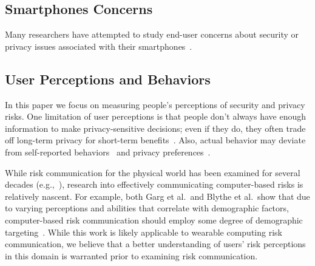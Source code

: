 \subsection{Smartphones Concerns}
Many researchers have attempted to study end-user concerns about security or privacy issues associated with their smartphones~\cite{chin2012measuring, palen2000going, felt2012android}.  

\subsection{User Perceptions and Behaviors}
In this paper we focus on measuring people's perceptions of security and privacy risks. One limitation of user perceptions is that people don't always have enough information to make privacy-sensitive decisions; even if they do, they often trade off long-term privacy for short-term benefits~\cite{acquisti2005privacy}. Also, actual behavior may deviate from self-reported behaviors~\cite{jensen2005privacy} and privacy preferences~\cite{spiekermann2001privacy}.

While risk communication for the physical world has been examined for several decades (e.g.,~\cite{Fischhoff,Morgan2001}), research into effectively communicating computer-based risks is relatively nascent. For example, both Garg et al.\ and Blythe et al.\ show that due to varying perceptions and abilities that correlate with demographic factors, computer-based risk communication should employ some degree of demographic targeting~\cite{Garg2012,Blythe2011}. While this work is likely applicable to wearable computing risk communication, we believe that a better understanding of users' risk perceptions in this domain is warranted prior to examining risk communication.
